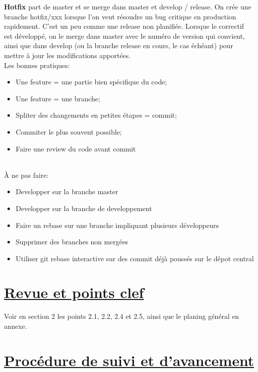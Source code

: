\documentclass{../res/univ-projet}
\begin{document}
\textbf{Hotfix} part de master et se merge dans master et develop / release.
On crée une branche hotfix/xxx lorsque l’on veut résoudre un bug critique en production rapidement. C’est un peu comme une release non planifiée. 
Lorsque le correctif est développé, on le merge dans master avec le numéro de version qui convient, ainsi que dans develop (ou la branche release en 
cours, le cas échéant) pour mettre à jour les modifications apportées. \\
\newpage
Les bonnes pratiques:
\begin{itemize}
   \item Une feature = une partie bien spécifique du code;
   \item Une feature = une branche;
   \item Spliter des changements en petites étapes = commit;
   \item Commiter le plus souvent possible;
   \item Faire une review du code avant commit
\end{itemize} ~\\

\`{A} ne pas faire:
\begin{itemize}
   \item Developper sur la branche master
   \item Developper sur la branche de developpement
   \item Faire un rebase sur une branche impliquant plusieurs développeurs
   \item Supprimer des branches non mergées
   \item Utiliser git rebase interactive sur des commit déjà poussés sur le dêpot central
\end{itemize}

\section{\underline{Revue et points clef}}

Voir en section 2 les points 2.1, 2.2, 2.4 et 2.5, ainsi que le planing général en annexe.
\section{\underline{Procédure de suivi et d'avancement}}
\end{document}
